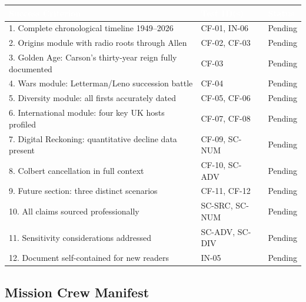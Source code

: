 \documentclass[11pt,letterpaper]{article}
\newcommand{\tableheader}[1]{\textbf{\sffamily\textcolor{white}{#1}}}
\begin{document}
\begin{center}
\begin{tabularx}{\textwidth}{XL{3.5cm}C{1.5cm}}
\toprule
{}
\tableheader{Success Criterion} & \tableheader{Test ID(s)} & \tableheader{Status} \\
. Complete chronological timeline 1949--2026 & CF-01, IN-06 & Pending \\
2. Origins module with radio roots through Allen & CF-02, CF-03 & Pending \\
3. Golden Age: Carson's thirty-year reign fully documented & CF-03 & Pending \\
4. Wars module: Letterman/Leno succession battle & CF-04 & Pending \\
5. Diversity module: all firsts accurately dated & CF-05, CF-06 & Pending \\
6. International module: four key UK hosts profiled & CF-07, CF-08 & Pending \\
7. Digital Reckoning: quantitative decline data present & CF-09, SC-NUM & Pending \\
8. Colbert cancellation in full context & CF-10, SC-ADV & Pending \\
9. Future section: three distinct scenarios & CF-11, CF-12 & Pending \\
10. All claims sourced professionally & SC-SRC, SC-NUM & Pending \\
11. Sensitivity considerations addressed & SC-ADV, SC-DIV & Pending \\
12. Document self-contained for new readers & IN-05 & Pending \\
\bottomrule
\end{tabularx}
\end{center}

\subsection{Mission Crew Manifest}
\end{document}
